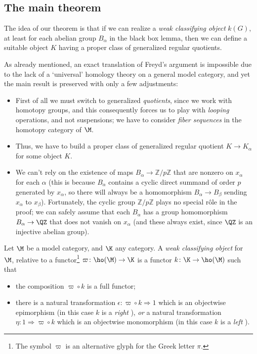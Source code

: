 \subsection{The main theorem}
\begin{remark}
The idea of our theorem is that if we can realize a \emph{weak classifying object} $k(G)$, at least for each abelian group $B_\alpha$ in the black box lemma, then we can define a suitable object $K$ having a proper class of generalized regular quotients.

As already mentioned, an exact translation of Freyd's argument is impossible due to the lack of a `universal' homology theory on a general model category, and yet the main result is preserved with only a few adjustments:%
\begin{itemize}
	\item First of all we must switch to generalized \emph{quotients}, since we work with homotopy groups, and this consequently forces us to play with \emph{looping} operations, and not suspensions; we have to consider \emph{fiber sequences} in the homotopy category of $\M$.
	\item Thus, we have to build a proper class of generalized regular quotient $K \to K_\alpha$ for some object $K$. 
	\item We can't rely on the existence of maps $B_\alpha \to \mathbb{Z}/p\mathbb{Z}$ that are nonzero on $x_\alpha$ for each $\alpha$ (this is because $B_\alpha$ contains a cyclic direct summand of order $p$ generated by $x_\alpha$, so there will always be a homomorphism $B_\alpha\to B_\beta$ sending $x_\alpha$ to $x_\beta$). Fortunately, the cyclic group $\mathbb{Z}/p\mathbb{Z}$ plays no special r\^ole in the proof; we can safely assume that each $B_\alpha$ has a group homomorphism $B_\alpha \to \QZ$ that does not vanish on $x_\alpha$ (and these always exist, since $\QZ$ is an injective abelian group).
\end{itemize}
\end{remark}
\begin{definition}\label{wcodef}
Let $\M$ be a model category, and $\K$ any category. A \emph{weak classifying object} for $\M$, relative to a functor\footnote{The symbol $\varpi$ is an alternative glyph for the Greek letter $\pi$.} $\varpi \colon \ho(\M) \to \K$ is a functor $k\colon \K \to \ho(\M)$ such that
\begin{itemize}
	\item the composition $\varpi\circ k$ is a full functor;
	\item there is a natural transformation $\epsilon\colon \varpi\circ k \Rightarrow 1$ which is an objectwise epimorphism (in this case $k$ is a \emph{right} \wco), \emph{or} a natural transformation $\eta \colon 1\Rightarrow \varpi\circ k$ which is an objectwise monomorphism (in this case $k$ is a \emph{left} \wco).
\end{itemize}
\end{definition}
